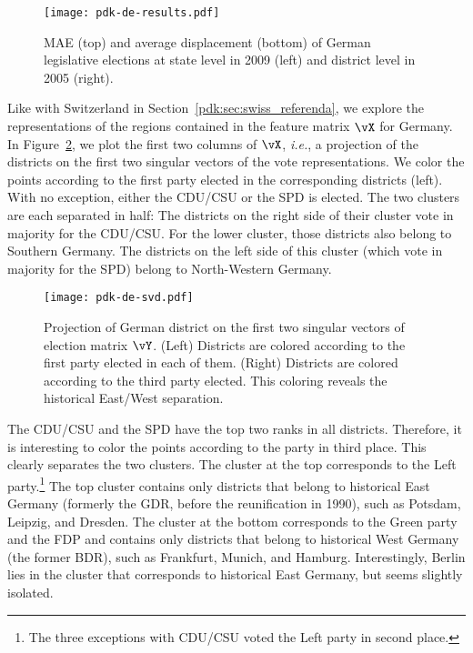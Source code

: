 \begin{figure}
	\centering
	\texttt{[image: pdk-de-results.pdf]}
	\caption{MAE (top) and average displacement (bottom) of German legislative elections at state level in 2009 (left) and district level in 2005 (right).}
	\label{pdk:fig:de_results}
\end{figure}

Like with Switzerland in Section~\ref{pdk:sec:swiss_referenda}, we explore the representations of the regions contained in the feature matrix $\vX$ for Germany.
In Figure~\ref{pdk:fig:de_svd}, we plot the first two columns of $\vX$, \textit{i.e.}, a projection of the districts on the first two singular vectors of the vote representations.
We color the points according to the first party elected in the corresponding districts (left).
With no exception, either the CDU/CSU or the SPD is elected.
The two clusters are each separated in half:
The districts on the right side of their cluster vote in majority for the CDU/CSU.
For the lower cluster, those districts also belong to Southern Germany.
The districts on the left side of this cluster (which vote in majority for the SPD) belong to North-Western Germany.

\begin{figure}
	\centering
	\texttt{[image: pdk-de-svd.pdf]}
	\caption{
		Projection of German district on the first two singular vectors of election matrix $\vY$.
		(Left) Districts are colored according to the first party elected in each of them.
		(Right) Districts are colored according to the third party elected.
		This coloring reveals the historical East/West separation.
	}
	\label{pdk:fig:de_svd}
\end{figure}

The CDU/CSU and the SPD have the top two ranks in all districts.
Therefore, it is interesting to color the points according to the party in third place.
This clearly separates the two clusters.
The cluster at the top corresponds to the Left party.\footnote{The three exceptions with CDU/CSU voted the Left party in second place.}
The top cluster contains only districts that belong to historical East Germany (formerly the GDR, before the reunification in 1990), such as Potsdam, Leipzig, and Dresden.
The cluster at the bottom corresponds to the Green party and the FDP and contains only districts that belong to historical West Germany (the former BDR), such as Frankfurt, Munich, and Hamburg.
Interestingly, Berlin lies in the cluster that corresponds to historical East Germany, but seems slightly isolated.
